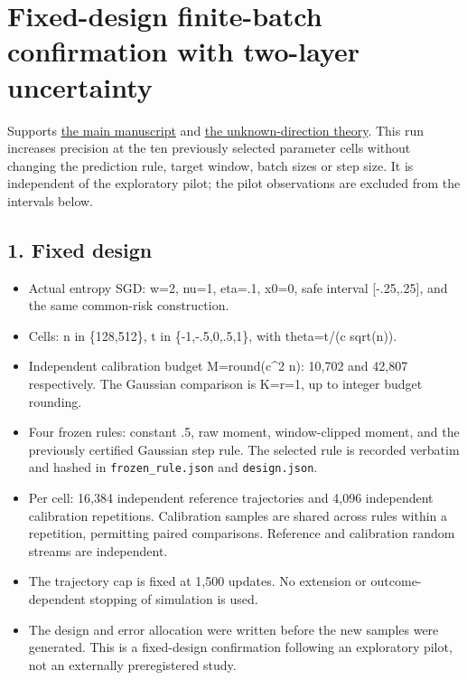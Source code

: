 \section{Fixed-design finite-batch confirmation with two-layer
uncertainty}\label{confirmation-fixed-design-finite-batch-confirmation-with-two-layer-uncertainty}

Supports \href{../../../paper/DRAFT.md}{the main manuscript} and
\href{../../../paper/unknown_direction.md}{the unknown-direction
theory}. This run increases precision at the ten previously selected
parameter cells without changing the prediction rule, target window,
batch sizes or step size. It is independent of the exploratory pilot;
the pilot observations are excluded from the intervals below.

\subsection{1. Fixed design}\label{confirmation-fixed-design}

\begin{itemize}
\tightlist
\item
  Actual entropy SGD: w=2, nu=1, eta=.1, x0=0, safe interval
  {[}-.25,.25{]}, and the same common-risk construction.
\item
  Cells: n in \{128,512\}, t in \{-1,-.5,0,.5,1\}, with theta=t/(c
  sqrt(n)).
\item
  Independent calibration budget M=round(c\^{}2 n): 10,702 and 42,807
  respectively. The Gaussian comparison is K=r=1, up to integer budget
  rounding.
\item
  Four frozen rules: constant .5, raw moment, window-clipped moment, and
  the previously certified Gaussian step rule. The selected rule is
  recorded verbatim and hashed in \texttt{frozen\_rule.json} and
  \texttt{design.json}.
\item
  Per cell: 16,384 independent reference trajectories and 4,096
  independent calibration repetitions. Calibration samples are shared
  across rules within a repetition, permitting paired comparisons.
  Reference and calibration random streams are independent.
\item
  The trajectory cap is fixed at 1,500 updates. No extension or
  outcome-dependent stopping of simulation is used.
\item
  The design and error allocation were written before the new samples
  were generated. This is a fixed-design confirmation following an
  exploratory pilot, not an externally preregistered study.
\end{itemize}

